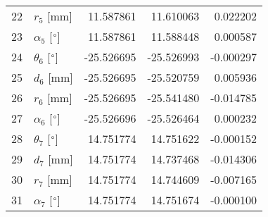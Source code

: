 \documentclass{standalone}%
\begin{document}
\begin{tabular}{llrrr}
22 &              $r_{5}$ [mm] &  11.587861 &  11.610063 &   0.022202 \\
23 &  $\alpha_{5}$ [$\degree$] &  11.587861 &  11.588448 &   0.000587 \\
24 &  $\theta_{6}$ [$\degree$] & -25.526695 & -25.526993 &  -0.000297 \\
25 &              $d_{6}$ [mm] & -25.526695 & -25.520759 &   0.005936 \\
26 &              $r_{6}$ [mm] & -25.526695 & -25.541480 &  -0.014785 \\
27 &  $\alpha_{6}$ [$\degree$] & -25.526696 & -25.526464 &   0.000232 \\
28 &  $\theta_{7}$ [$\degree$] &  14.751774 &  14.751622 &  -0.000152 \\
29 &              $d_{7}$ [mm] &  14.751774 &  14.737468 &  -0.014306 \\
30 &              $r_{7}$ [mm] &  14.751774 &  14.744609 &  -0.007165 \\
31 &  $\alpha_{7}$ [$\degree$] &  14.751774 &  14.751674 &  -0.000100 \\
\bottomrule
\end{tabular}
%
\end{document}
